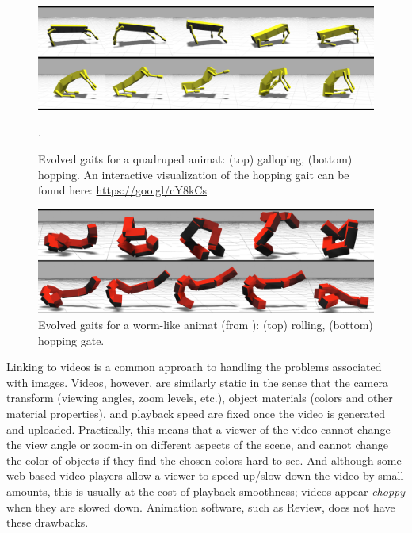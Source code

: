 \begin{figure}[htb!]
\centering
\includegraphics[width=\textwidth]{figures/GECCO_Passive_Gaits_4_x_2_6_5.png}
\caption{Evolved gaits for a quadruped animat: (top) galloping, (bottom) hopping. An interactive visualization of the hopping gait can be found here: \url{https://goo.gl/cY8kCs}}.
\label{fig:passive_flex_gaits}
\end{figure}

\begin{figure}[htb!]
\centering
\includegraphics[width=\textwidth]{figures/Worm_Composite_5_x_1.png}
\caption{Evolved gaits for a worm-like animat (from \textcite{Moore.2017.GECCO.Animat}): (top) rolling, (bottom) hopping gate.}
\label{fig:worm_gaits}
\end{figure}


Linking to videos is a common approach to handling the problems associated with images.
%
Videos, however, are similarly static in the sense that the camera transform (viewing angles, zoom levels, etc.), object materials (colors and other material properties), and playback speed are fixed once the video is generated and uploaded.
%
Practically, this means that a viewer of the video cannot change the view angle or zoom-in on different aspects of the scene, and cannot change the color of objects if they find the chosen colors hard to see.
%
And although some web-based video players allow a viewer to speed-up/slow-down the video by small amounts, this is usually at the cost of playback smoothness; videos appear \emph{choppy} when they are slowed down.
%
Animation software, such as Review, does not have these drawbacks.




